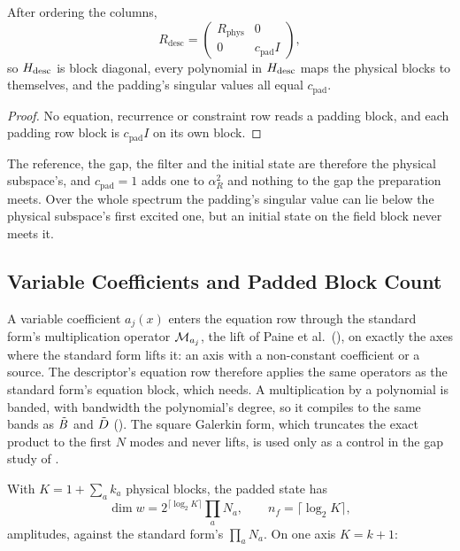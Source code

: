 \begin{proposition}
\label{prop:padding-decouples}
After ordering the columns,
\begin{equation*}
    R_{\mathrm{desc}}=\begin{pmatrix}R_{\mathrm{phys}}&0\\0&c_{\mathrm{pad}}I\end{pmatrix},
\end{equation*}
so $H_{\mathrm{desc}}$ is block diagonal, every polynomial in $H_{\mathrm{desc}}$ maps the physical blocks to themselves, and the padding's singular values all equal $c_{\mathrm{pad}}$.
\end{proposition}
\begin{proof}
No equation, recurrence or constraint row reads a padding block, and each padding row block is $c_{\mathrm{pad}}I$ on its own block.
\end{proof}

The reference, the gap, the filter and the initial state are therefore the physical subspace's, and $c_{\mathrm{pad}}=1$ adds one to $\alpha_R^2$ and nothing to the gap the preparation meets. Over the whole spectrum the padding's singular value can lie below the physical subspace's first excited one, but an initial state on the field block never meets it.

\subsection{Variable Coefficients and Padded Block Count}
\label{sec:app-variable-coeff}

A variable coefficient $a_j(x)$ enters the equation row through the standard form's multiplication operator $\mathcal{M}_{a_j}$, the lift of Paine et al.\ (), on exactly the axes where the standard form lifts it: an axis with a non-constant coefficient or a source. The descriptor's equation row therefore applies the same operators as the standard form's equation block, which  needs. A multiplication by a polynomial is banded, with bandwidth the polynomial's degree, so it compiles to the same bands as $\tilde{B}$ and $\tilde{D}$ (). The square Galerkin form, which truncates the exact product to the first $N$ modes and never lifts, is used only as a control in the gap study of .

With $K=1+\sum_ak_a$ physical blocks, the padded state has
\begin{equation}
    \dim w = 2^{\lceil\log_2K\rceil}\prod_aN_a,
    \qquad
    n_f=\lceil\log_2K\rceil ,
    \label{eq:app-padded-count}
\end{equation}
amplitudes, against the standard form's $\prod_aN_a$. On one axis $K=k+1$:

